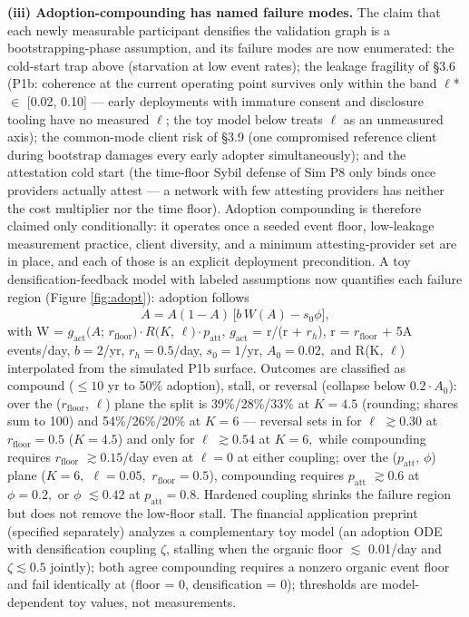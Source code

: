 \documentclass[11pt,twocolumn]{article}
\begin{document}
\textbf{(iii) Adoption-compounding has named failure modes.} The claim
that each newly measurable participant densifies the validation graph is
a bootstrapping-phase assumption, and its failure modes are now
enumerated: the cold-start trap above (starvation at low event rates);
the leakage fragility of §3.6 (P1b: coherence at the current operating
point survives only within the band \(\ell\)* \(\in\) {[}0.02, 0.10{]}
--- early deployments with immature consent and disclosure tooling
have no measured \(\ell\); the toy model below treats \(\ell\) as an
unmeasured axis); the common-mode client risk of §3.9
(one compromised reference client during bootstrap damages every early
adopter simultaneously); and the attestation cold start (the time-floor
Sybil defense of Sim P8 only binds once providers actually attest --- a
network with few attesting providers has neither the cost multiplier nor
the time floor). Adoption compounding is therefore claimed only
conditionally: it operates once a seeded event floor, low-leakage
measurement practice, client diversity, and a minimum attesting-provider
set are in place, and each of those is an explicit deployment
precondition. A toy densification-feedback model with labeled
assumptions now quantifies each failure region (Figure \ref{fig:adopt}):
adoption follows \begin{equation} \dot{A} = A(1-A)\,\bigl[b\,W(A) - s_0\phi\bigr], \label{eq:adopt} \end{equation} with W = \(g_{\mathrm{act}}(A\);
\(r_{\mathrm{floor}})\cdot R(K\), \(\ell)\cdot p_{\mathrm{att}}\),
\(g_{\mathrm{act}}\) = r/(r + \(r_h\)), r = \(r_{\mathrm{floor}}\) + 5A
events/day, \(b = 2\)/yr, \(r_h = 0.5\)/day, \(s_{0} = 1\)/yr,
\(A_{0} = 0.02,\) and R(K, \(\ell\)) interpolated from the simulated P1b
surface. Outcomes are classified as compound (\(\leq 10\) yr to 50\%
adoption), stall, or reversal (collapse below \(0.2\cdot A_{0}\)): over
the (\(r_{\mathrm{floor}}\), \(\ell\)) plane the split is 39\%/28\%/33\%
at \(K = 4.5\) (rounding; shares sum to 100) and 54\%/26\%/20\% at \(K = 6\) --- reversal sets in for
\(\ell\) \(\gtrsim 0.30\) at \(r_{\mathrm{floor}} = 0.5\) (\(K = 4.5\))
and only for \(\ell\) \(\gtrsim 0.54\) at \(K = 6,\) while compounding
requires \(r_{\mathrm{floor}}\) \(\gtrsim 0.15\)/day even at
\(\ell = 0\) at either coupling; over the (\(p_{\mathrm{att}}\),
\(\phi\)) plane (\(K = 6,\) \(\ell = 0.05,\)
\(r_{\mathrm{floor}} = 0.5\)), compounding requires \(p_{\mathrm{att}}\)
\(\gtrsim 0.6\) at \(\phi = 0.2,\) or \(\phi\) \(\lesssim 0.42\) at
\(p_{\mathrm{att}} = 0.8.\) Hardened coupling shrinks the failure region
but does not remove the low-floor stall. The financial application preprint (specified separately) analyzes a complementary toy model (an adoption ODE with densification
coupling \(\zeta\), stalling when the organic floor \(\lesssim\)
0.01/day and \(\zeta \lesssim 0.5\) jointly); both agree compounding
requires a nonzero organic event floor and fail identically at (floor =
0, densification = 0); thresholds are model-dependent toy values, not
measurements.
\end{document}
